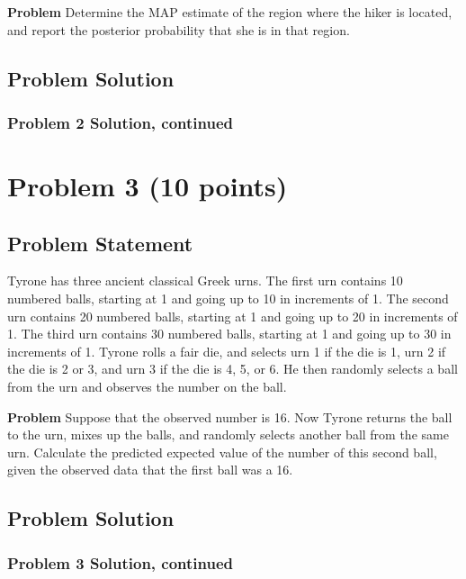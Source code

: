 \documentclass[12pt]{article}
\theoremstyle{definition}
\begin{document}
\bigskip
\noindent
{\bf Problem} Determine the MAP estimate of the region where the hiker is located, and report the posterior probability that she is in that region.

\subsection*{Problem Solution}

\newpage
\subsubsection*{Problem 2 Solution, continued}

\newpage
\section*{Problem 3 (10 points)}

\subsection*{Problem Statement}

Tyrone has three ancient classical Greek urns. The first urn contains 10 numbered balls, starting at 1 and going up to 10 in increments of 1. The second urn contains 20 numbered balls, starting at 1 and going up to 20 in increments of 1. The third urn contains 30 numbered balls, starting at 1 and going up to 30 in increments of 1. Tyrone rolls a fair die, and selects urn 1 if the die is 1, urn 2 if the die is 2 or 3, and urn 3 if the die is 4, 5, or 6. He then randomly selects a ball from the urn and observes the number on the ball.

\bigskip
\noindent
{\bf Problem} Suppose that the observed number is 16. Now Tyrone returns the ball to the urn, mixes up the balls, and randomly selects another ball from the same urn. Calculate the predicted expected value of the number of this second ball, given the observed data that the first ball was a 16.

\subsection*{Problem Solution}

\newpage
\subsubsection*{Problem 3 Solution, continued}
\end{document}
